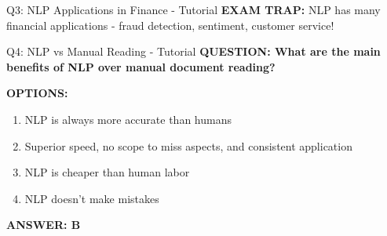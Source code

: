 \documentclass[8pt]{beamer}
\begin{document}
\begin{frame}{Q3: NLP Applications in Finance - Tutorial}
		\textcolor{myred}{\textbf{EXAM TRAP:}} NLP has \textcolor{myblue}{many financial applications} - fraud detection, sentiment, customer service!
	\end{frame}
	
	\begin{frame}{Q4: NLP vs Manual Reading - Tutorial}
		\fontsize{6.5}{7.5}\selectfont
		\textbf{QUESTION: What are the main benefits of NLP over manual document reading?}
		
		\vspace{0.1cm}
		\textbf{OPTIONS:}
		\begin{enumerate}
			\item NLP is always more accurate than humans
			\item Superior speed, no scope to miss aspects, and consistent application
			\item NLP is cheaper than human labor
			\item NLP doesn't make mistakes
		\end{enumerate}
		
		\vspace{0.1cm}
		\textcolor{myblue}{\textbf{ANSWER: B}}
		

\end{frame}
\end{document}
